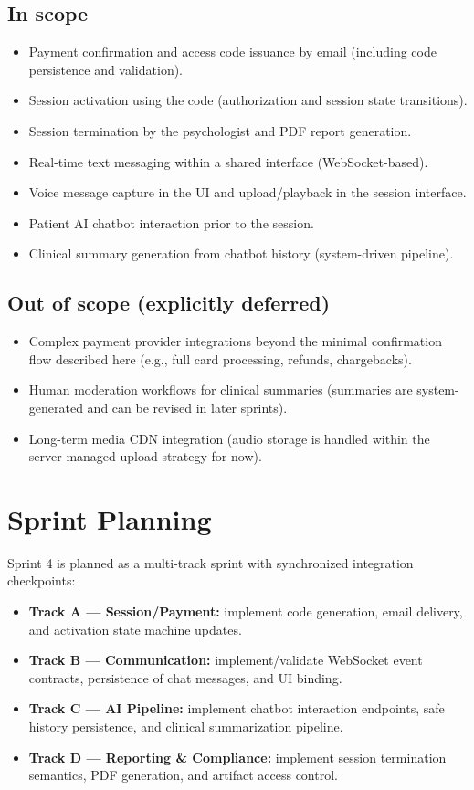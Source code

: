 \documentclass[12pt]{article}
\begin{document}
\subsection*{In scope}
\begin{itemize}[leftmargin=*]
  \item Payment confirmation and access code issuance by email (including code persistence and validation).
  \item Session activation using the code (authorization and session state transitions).
  \item Session termination by the psychologist and PDF report generation.
  \item Real-time text messaging within a shared interface (WebSocket-based).
  \item Voice message capture in the UI and upload/playback in the session interface.
  \item Patient AI chatbot interaction prior to the session.
  \item Clinical summary generation from chatbot history (system-driven pipeline).
\end{itemize}

\subsection*{Out of scope (explicitly deferred)}
\begin{itemize}[leftmargin=*]
  \item Complex payment provider integrations beyond the minimal confirmation flow described here (e.g., full card processing, refunds, chargebacks).
  \item Human moderation workflows for clinical summaries (summaries are system-generated and can be revised in later sprints).
  \item Long-term media CDN integration (audio storage is handled within the server-managed upload strategy for now).
\end{itemize}

\section{Sprint Planning}
Sprint 4 is planned as a multi-track sprint with synchronized integration checkpoints:
\begin{itemize}[leftmargin=*]
  \item \textbf{Track A --- Session/Payment:} implement code generation, email delivery, and activation state machine updates.
  \item \textbf{Track B --- Communication:} implement/validate WebSocket event contracts, persistence of chat messages, and UI binding.
  \item \textbf{Track C --- AI Pipeline:} implement chatbot interaction endpoints, safe history persistence, and clinical summarization pipeline.
  \item \textbf{Track D --- Reporting \& Compliance:} implement session termination semantics, PDF generation, and artifact access control.
\end{itemize}
\end{document}
